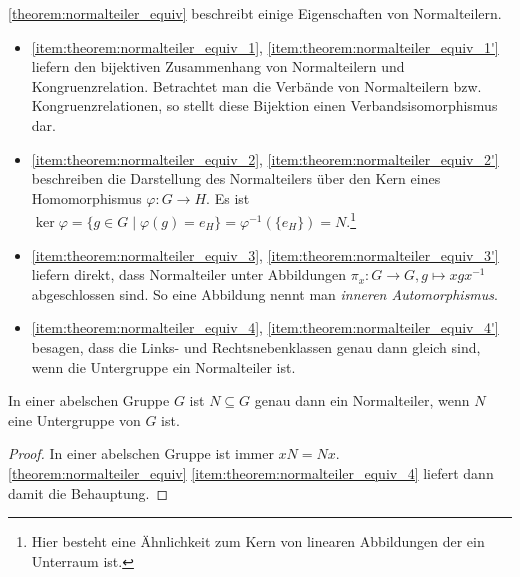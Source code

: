 \begin{remark}
    \cref{theorem:normalteiler_equiv} beschreibt einige Eigenschaften von Normalteilern.
    \begin{itemize}[label={--}]
        \item \ref*{item:theorem:normalteiler_equiv_1}, \ref*{item:theorem:normalteiler_equiv_1'} liefern den bijektiven Zusammenhang von Normalteilern und Kongruenzrelation. Betrachtet man die Verbände von Normalteilern bzw. Kongruenzrelationen, so stellt diese Bijektion einen Verbandsisomorphismus dar.
        \item \ref*{item:theorem:normalteiler_equiv_2}, \ref*{item:theorem:normalteiler_equiv_2'} beschreiben die Darstellung des Normalteilers über den Kern eines Homomorphismus $\varphi: G \to H$. Es ist $\ker \varphi = \{g \in G \mid \varphi(g) = e_H\} = \varphi^{-1}(\{e_H\}) = N$.\footnote{Hier besteht eine Ähnlichkeit zum Kern von linearen Abbildungen der ein Unterraum ist.}
        \item \ref*{item:theorem:normalteiler_equiv_3}, \ref*{item:theorem:normalteiler_equiv_3'} liefern direkt, dass Normalteiler unter Abbildungen $\pi_x: G \to G, g \mapsto xgx^{-1}$ abgeschlossen sind. So eine Abbildung nennt man \emph{inneren Automorphismus}.
        \item \ref*{item:theorem:normalteiler_equiv_4}, \ref*{item:theorem:normalteiler_equiv_4'} besagen, dass die Links- und Rechtsnebenklassen genau dann gleich sind, wenn die Untergruppe ein Normalteiler ist.
    \end{itemize}
\end{remark}

\begin{corollary}
    In einer abelschen Gruppe $G$ ist $N \subseteq G$ genau dann ein Normalteiler, wenn $N$ eine Untergruppe von $G$ ist.
\end{corollary}
\begin{proof}
    In einer abelschen Gruppe ist immer $xN = Nx$. \cref{theorem:normalteiler_equiv} \ref*{item:theorem:normalteiler_equiv_4} liefert dann damit die Behauptung.
\end{proof}